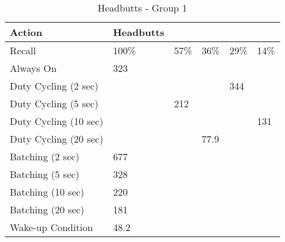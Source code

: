 \begin{table*}[t]
    \begin{tabular}{|l|l|l|l|l|l|}
    \hline
    Action                & Headbutts & ~   & ~    & ~   & ~   \\ \hline
    Recall                & 100\%     & 57\% & 36\% & 29\% & 14\% \\ \hline
    Always On             & 323       & ~   & ~    & ~   & ~   \\ \hline
    Duty Cycling (2 sec)  & ~         & ~   & ~    & 344 & ~   \\ \hline
    Duty Cycling (5 sec)  & ~         & 212 & ~    & ~   & ~   \\ \hline
    Duty Cycling (10 sec) & ~         & ~   & ~    & ~   & 131 \\ \hline
    Duty Cycling (20 sec) & ~         & ~   & 77.9 & ~   & ~   \\ \hline
    Batching (2 sec)      & 677       & ~   & ~    & ~   & ~   \\ \hline
    Batching (5 sec)      & 328       & ~   & ~    & ~   & ~   \\ \hline
    Batching (10 sec)     & 220       & ~   & ~    & ~   & ~   \\ \hline
    Batching (20 sec)     & 181       & ~   & ~    & ~   & ~   \\ \hline
    Wake-up Condition     & 48.2      & ~   & ~    & ~   & ~   \\ \hline
    \end{tabular}
	\caption{Headbutts - Group 1}
	\label{table:powerProfileNexus}
\end{table*}

